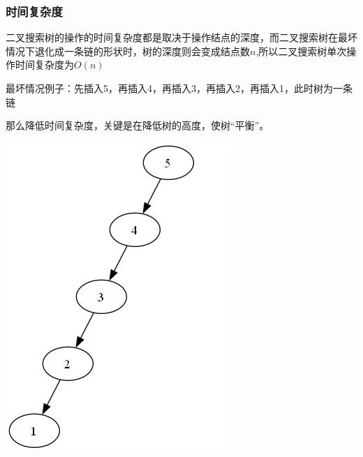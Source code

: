 \documentclass[utf8]{ctexbeamer}
\begin{document}
    \begin{frame}
        \frametitle{时间复杂度}
        \noindent
        \begin{minipage}[b]{0.5\textwidth}
            二叉搜索树的操作的时间复杂度都是取决于操作结点的深度，而二叉搜索树在最坏情况下退化成一条链的形状时，树的深度则会变成结点数$n$,所以二叉搜索树单次操作时间复杂度为$O(n)$
            
            最坏情况例子：先插入5，再插入4，再插入3，再插入2，再插入1，此时树为一条链

            那么降低时间复杂度，关键是在降低树的高度，使树“平衡”。
        \end{minipage}
        \hfill
        \begin{minipage}[b]{0.4\textwidth}
            \includegraphics[width=\linewidth]{images/BST_list.png}
        \end{minipage}
        
    \end{frame}
\end{document}
